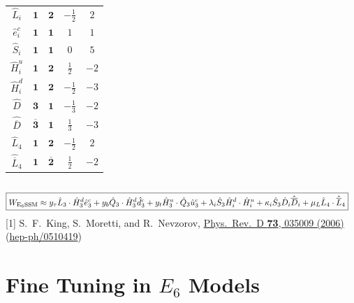 \documentclass[10pt,aspectratio=169]{beamer}
\begin{document}
\begin{frame}
\begin{columns}[t]
\begin{column}{0.5\textwidth}
\begin{table}[h]
\begin{tabular}{ccccc}
            $\hat{L}_i$ & $\mathbf{1}$ & $\mathbf{2}$ & $-\frac{1}{2}$ & $2$ \\
            $\hat{e}_i^c$ & $\mathbf{1}$ & $\mathbf{1}$ & $1$ & $1$ \\
            $\hat{S}_i$ & $\mathbf{1}$ & $\mathbf{1}$ & $0$ & $5$ \\
            $\hat{H}_i^u$ & $\mathbf{1}$ & $\mathbf{2}$ & $\frac{1}{2}$
            & $-2$ \\
            $\hat{H}_i^d$ & $\mathbf{1}$ & $\mathbf{2}$ & $-\frac{1}{2}$
            & $-3$ \\
            $\hat{D}$ & $\mathbf{3}$ & $\mathbf{1}$ & $-\frac{1}{3}$ & $-2$ \\
            $\hat{\overline{D}}$ & $\mathbf{\overline{3}}$ &  $\mathbf{1}$
            & $\frac{1}{3}$ & $-3$ \\
            $\hat{L}_4$ & $\mathbf{1}$ & $\mathbf{2}$ & $-\frac{1}{2}$ & $2$ \\
            $\hat{\overline{L}}_4$ & $\mathbf{1}$ & $\mathbf{\overline{2}}$
            & $\frac{1}{2}$ & $-2$ \\
            \bottomrule
          \end{tabular}
        \end{table}
      \end{column}
    \end{columns}
    \vspace{-4pt}
    \begin{align*}
      \Aboxed{W_{\text{E}_6\text{SSM}} \approx y_{\tau} \hat{L}_3 \cdot
        \hat{H}^d_3 \hat{e}^c_3 + y_b \hat{Q}_3 \cdot \hat{H}^d_3 \hat{d}_3^c
        + y_t \hat{H}^u_3 \cdot \hat{Q}_3 \hat{u}_3^c + \lambda_i \hat{S}_3
        \hat{H}_i^d \cdot \hat{H}_i^u  + \kappa_i \hat{S}_3 \hat{D}_i
        \hat{\overline{D}}_i + \mu_L \hat{L}_4 \cdot \hat{\overline{L}}_4}
    \end{align*}
        {\tiny [1] S.~F.~King, S.~Moretti, and R.~Nevzorov,
          \href{http://dx.doi.org/10.1103/PhysRevD.73.035009}{Phys.~Rev.~D
            \textbf{73}, 035009 (2006)}
          (\href{http://arxiv.org/abs/hep-ph/0510419}{hep-ph/0510419})}
\end{frame}

\section{Fine Tuning in $E_6$ Models}
\end{document}
